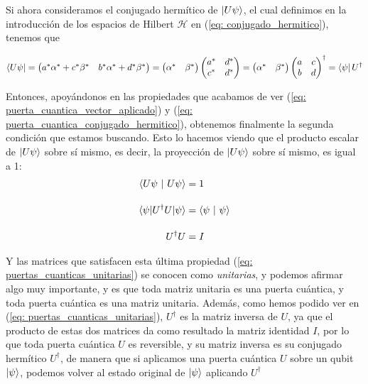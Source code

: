 \documentclass{article}
\numberwithin{equation}{section} %
\begin{document}
    \vspace{2.5mm}

    Si ahora consideramos el conjugado hermítico de \( \ket{U \psi} \), el cual definimos en la introducción de los espacios de Hilbert \( \mathcal{H} \) en (\ref{eq: conjugado_hermitico}), tenemos que

    \begin{equation}
        \bra{U \psi} = \begin{pmatrix}
            a^{*} \alpha^{*} + c^{*} \beta^{*} & b^{*} \alpha^{*} + d^{*} \beta^{*} 
        \end{pmatrix} = \begin{pmatrix}
            \alpha^{*} & \beta^{*}
        \end{pmatrix} \begin{pmatrix}
            a^{*} & d^{*} \\
            c^{*} & d^{*}
        \end{pmatrix} = \begin{pmatrix}
            \alpha^{*} & \beta^{*}
        \end{pmatrix} \begin{pmatrix}
            a & c \\
            b & d
        \end{pmatrix} ^ {\dagger} = \bra{\psi} U^{\dagger}
    \label{eq: puerta_cuantica_conjugado_hermitico}
    \end{equation}

    \vspace{2.5mm}

    Entonces, apoyándonos en las propiedades que acabamos de ver (\ref{eq: puerta_cuantica_vector_aplicado}) y (\ref{eq: puerta_cuantica_conjugado_hermitico}), obtenemos finalmente la segunda condición que estamos buscando. Esto lo hacemos viendo que el producto escalar de \( \ket{U \psi} \) sobre sí mismo, es decir, la proyección de \( \ket{U \psi} \) sobre sí mismo, es igual a 1:
    \begin{align}
        \braket{U \psi \ | \ U \psi} &= 1 \nonumber \\[10pt]
        \braket{\psi | U^{\dagger} U | \psi} &= \braket{\psi \ | \ \psi} \nonumber \\[10pt]
        U^{\dagger} U &= I
        \label{eq: puertas_cuanticas_unitarias}
    \end{align}

    Y las matrices que satisfacen esta última propiedad (\ref{eq: puertas_cuanticas_unitarias}) se conocen como \textit{unitarias}, y podemos afirmar algo muy importante, y es que toda matriz unitaria es una puerta cuántica, y toda puerta cuántica es una matriz unitaria. Además, como hemos podido ver en (\ref{eq: puertas_cuanticas_unitarias}), \( U^{\dagger} \) es la matriz inversa de \( U \), ya que el producto de estas dos matrices da como resultado la matriz identidad \( I \), por lo que toda puerta cuántica \( U \) es reversible, y su matriz inversa es su conjugado hermítico \( U^{\dagger} \), de manera que si aplicamos una puerta cuántica \( U \) sobre un qubit \( \ket{\psi} \), podemos volver al estado original de \( \ket{\psi} \) aplicando \( U^{\dagger} \)
\end{document}
